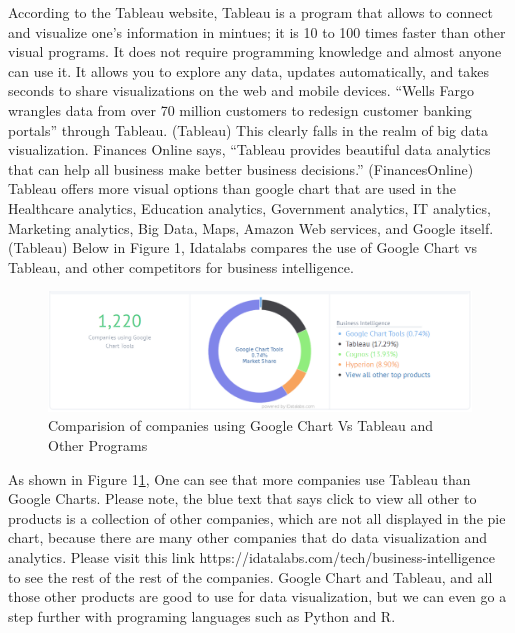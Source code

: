 \documentclass[sigconf]{acmart}
\begin{document}
According to the Tableau website, Tableau is a program that allows to connect and visualize one’s information in mintues; it is 10 to 100 times faster than other visual programs. It does not require programming knowledge and almost anyone can use it. It allows you to explore any data, updates automatically, and takes seconds to share visualizations on the web and mobile devices. “Wells Fargo wrangles data from over 70 million customers to redesign customer banking portals” through Tableau. (Tableau) This clearly falls in the realm of big data visualization. Finances Online says, “Tableau provides beautiful data analytics that can help all business make better business decisions.” (FinancesOnline) Tableau offers more visual options than google chart that are used in the Healthcare analytics, Education analytics, Government analytics, IT analytics, Marketing analytics, Big Data, Maps, Amazon Web services, and Google itself. (Tableau) Below in Figure 1, Idatalabs compares the use of Google Chart vs Tableau, and other competitors for business intelligence. 

\begin{figure}[htb]
  \centering
  \includegraphics[width=1.0\columnwidth]{paper2/Figure 1.png}
  \caption{Comparision of companies using Google Chart Vs Tableau and Other Programs
  \cite{Idatalabs}}
  \label{fig:Figure 1} 
\end{figure}

As shown in Figure 1\ref{fig:Figure 1}, One can see that more companies use Tableau than Google Charts. Please note, the blue text that says click to view all other to products is a collection of other companies, which are not all displayed in the pie chart, because there are many other companies that do data visualization and analytics. Please visit this link https://idatalabs.com/tech/business-intelligence to see the rest of the rest of the companies. Google Chart and Tableau, and all those other products are good to use for data visualization, but we can even go a step further with programing languages such as Python and R. 
\end{document}
